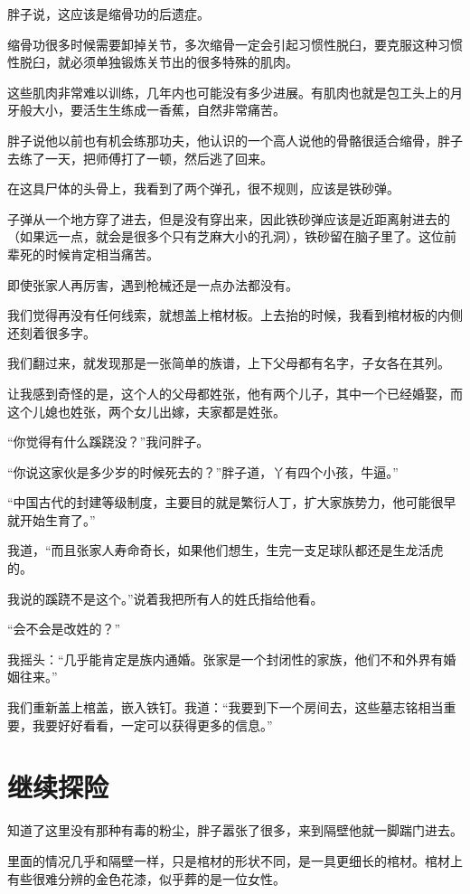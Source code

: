 胖子说，这应该是缩骨功的后遗症。

缩骨功很多时候需要卸掉关节，多次缩骨一定会引起习惯性脱臼，要克服这种习惯性脱臼，就必须单独锻炼关节出的很多特殊的肌肉。

这些肌肉非常难以训练，几年内也可能没有多少进展。有肌肉也就是包工头上的月牙般大小，要活生生练成一香蕉，自然非常痛苦。

胖子说他以前也有机会练那功夫，他认识的一个高人说他的骨骼很适合缩骨，胖子去练了一天，把师傅打了一顿，然后逃了回来。

在这具尸体的头骨上，我看到了两个弹孔，很不规则，应该是铁砂弹。

子弹从一个地方穿了进去，但是没有穿出来，因此铁砂弹应该是近距离射进去的（如果远一点，就会是很多个只有芝麻大小的孔洞），铁砂留在脑子里了。这位前辈死的时候肯定相当痛苦。

即使张家人再厉害，遇到枪械还是一点办法都没有。

我们觉得再没有任何线索，就想盖上棺材板。上去抬的时候，我看到棺材板的内侧还刻着很多字。

我们翻过来，就发现那是一张简单的族谱，上下父母都有名字，子女各在其列。

让我感到奇怪的是，这个人的父母都姓张，他有两个儿子，其中一个已经婚娶，而这个儿媳也姓张，两个女儿出嫁，夫家都是姓张。

“你觉得有什么蹊跷没？”我问胖子。

“你说这家伙是多少岁的时候死去的？”胖子道，丫有四个小孩，牛逼。”

“中国古代的封建等级制度，主要目的就是繁衍人丁，扩大家族势力，他可能很早就开始生育了。”

我道，“而且张家人寿命奇长，如果他们想生，生完一支足球队都还是生龙活虎的。

我说的蹊跷不是这个。”说着我把所有人的姓氏指给他看。

“会不会是改姓的？”

我摇头：“几乎能肯定是族内通婚。张家是一个封闭性的家族，他们不和外界有婚姻往来。”

我们重新盖上棺盖，嵌入铁钉。我道：“我要到下一个房间去，这些墓志铭相当重要，我要好好看看，一定可以获得更多的信息。”

\chapter{继续探险}

知道了这里没有那种有毒的粉尘，胖子嚣张了很多，来到隔壁他就一脚踹门进去。

里面的情况几乎和隔壁一样，只是棺材的形状不同，是一具更细长的棺材。棺材上有些很难分辨的金色花漆，似乎葬的是一位女性。

